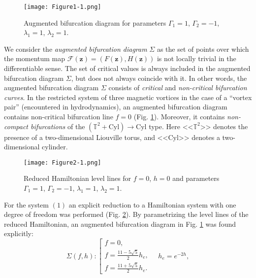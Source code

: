 \begin{figure}[!t]
  \centering
  \texttt{[image: Figure1-1.png]}
  \caption{Augmented bifurcation diagram for parameters $\Gamma_1=1$, $\Gamma_2=-1$, $\lambda_1=1$, $\lambda_2=1$.}\label{PalshinGP_fig1}
\end{figure}

We consider the \textit{augmented bifurcation diagram} $\Sigma$ as the set of points over which the momentum map $\mathcal{F}(\boldsymbol{z})=(F(\boldsymbol{z}),H(\boldsymbol{z}))$ is not locally trivial in the differentiable sense. The set of critical values is always included in the augmented bifurcation diagram $\Sigma$, but does not always coincide with it. In other words, the augmented bifurcation diagram $\Sigma$ consists of \textit{critical} and \textit{non-critical bifurcation curves}. In the restricted system of three magnetic vortices in the case of a ``vortex pair'' (encountered in hyd\-ro\-dyna\-mics), an augmented bifurcation diagram contains non-critical bifurcation line $f=0$ (Fig. \ref{PalshinGP_fig1}). Moreover, it contains \textit{non-compact bifurcations} of the $\left( \mathbb{T}^2 + \mathrm{Cyl} \right) \rightarrow \mathrm{Cyl}$ type. Here <<$\mathbb{T}^2$>> denotes the presence of a two-dimensional Liouville torus, and <<$\mathrm{Cyl}$>> denotes a two-dimensional cylinder.

\begin{figure}[!t]
  \centering
  \texttt{[image: Figure2-1.png]}
  \caption{Reduced Hamiltonian level lines for $f=0$, $h = 0$ and parameters $\Gamma_1=1$, $\Gamma_2=-1$, $\lambda_1=1$, $\lambda_2=1$.}\label{PalshinGP_fig2}
\end{figure}

For the system $(1)$ an explicit reduction to a Hamiltonian system with one degree of freedom was performed (Fig. \ref{PalshinGP_fig2}). By pa\-ra\-met\-ri\-zing the level lines of the reduced Hamiltonian, an aug\-men\-ted bi\-fur\-ca\-tion diagram in Fig. \ref{PalshinGP_fig1} was found explicitly:
\begin{equation*}
\Sigma(f,h): \left[
\begin{array}{l}
\displaystyle{
f=0,}
\\[3mm]
\displaystyle{
f=\frac{11-5\sqrt{5}}{2} h_e,}
\\[3mm]
\displaystyle{
f=\frac{11+5\sqrt{5}}{2} h_e.}
\end{array}
\right.
\quad
h_e=e^{-2h},
\end{equation*}

